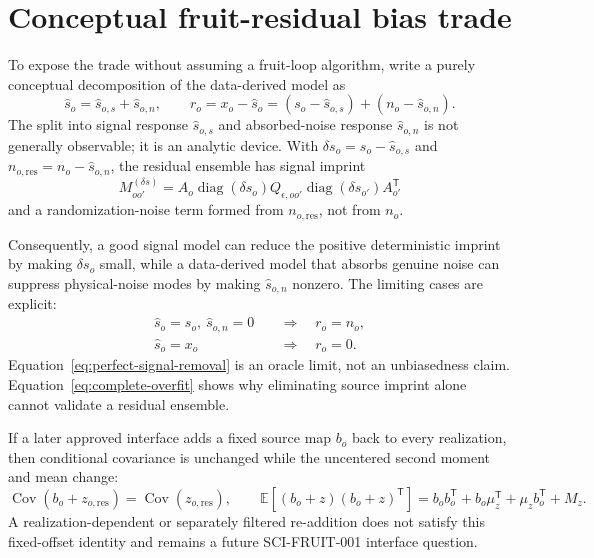 \documentclass[11pt]{article}
\newcommand{\E}{\mathbb{E}}
\newcommand{\Cov}{\operatorname{Cov}}
\newcommand{\diag}{\operatorname{diag}}
\begin{document}
\section{Conceptual fruit-residual bias trade}

To expose the trade without assuming a fruit-loop algorithm, write a purely
conceptual decomposition of the data-derived model as
\begin{equation}
  \widehat s_o=\widehat s_{o,s}+\widehat s_{o,n},
  \qquad
  r_o=x_o-\widehat s_o
  =(s_o-\widehat s_{o,s})+(n_o-\widehat s_{o,n}).
  \label{eq:residual-decomposition}
\end{equation}
The split into signal response $\widehat s_{o,s}$ and absorbed-noise response
$\widehat s_{o,n}$ is not generally observable; it is an analytic device.
With
$\delta s_o=s_o-\widehat s_{o,s}$ and
$n_{o,\mathrm{res}}=n_o-\widehat s_{o,n}$, the residual ensemble has signal
imprint
\begin{equation}
  M_{oo'}^{(\delta s)}
  =A_o\diag(\delta s_o)Q_{\epsilon,oo'}
   \diag(\delta s_{o'})A_{o'}^{\mathsf T}
  \label{eq:residual-signal-imprint}
\end{equation}
and a randomization-noise term formed from $n_{o,\mathrm{res}}$, not from
$n_o$.

Consequently, a good signal model can reduce the positive deterministic
imprint by making $\delta s_o$ small, while a data-derived model that absorbs
genuine noise can suppress physical-noise modes by making
$\widehat s_{o,n}$ nonzero.  The limiting cases are explicit:
\begin{align}
  \widehat s_o=s_o,\ \widehat s_{o,n}=0
  &\quad\Longrightarrow\quad r_o=n_o,
  \label{eq:perfect-signal-removal}\\
  \widehat s_o=x_o
  &\quad\Longrightarrow\quad r_o=0.
  \label{eq:complete-overfit}
\end{align}
Equation~\eqref{eq:perfect-signal-removal} is an oracle limit, not an
unbiasedness claim.  Equation~\eqref{eq:complete-overfit} shows why eliminating
source imprint alone cannot validate a residual ensemble.

If a later approved interface adds a fixed source map $b_o$ back to every
realization, then conditional covariance is unchanged while the uncentered
second moment and mean change:
\begin{equation}
  \Cov(b_o+z_{o,\mathrm{res}})=\Cov(z_{o,\mathrm{res}}),
  \qquad
  \E[(b_o+z)(b_o+z)^{\mathsf T}]
  =b_ob_o^{\mathsf T}+b_o\mu_z^{\mathsf T}
   +\mu_zb_o^{\mathsf T}+M_z.
  \label{eq:fixed-source-readdition}
\end{equation}
A realization-dependent or separately filtered re-addition does not satisfy
this fixed-offset identity and remains a future SCI-FRUIT-001 interface
question.
\end{document}
